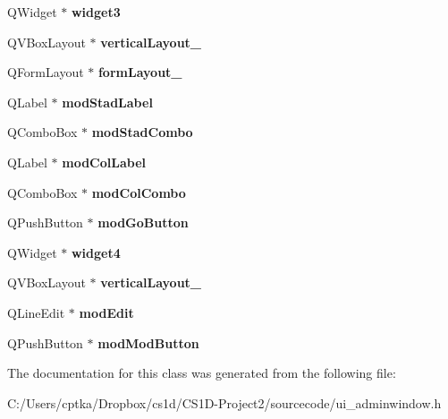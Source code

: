 \begin{DoxyCompactItemize}
Q\+Widget $\ast$ {\bfseries widget3}
\item 
\mbox{\label{class_ui___admin_window_acf63d0b9edd449bed7a6fd6505d3f020}} 
Q\+V\+Box\+Layout $\ast$ {\bfseries vertical\+Layout\+\_}
\item 
\mbox{\label{class_ui___admin_window_a77b319e8cf6e07d599ad4ad74b9022e6}} 
Q\+Form\+Layout $\ast$ {\bfseries form\+Layout\+\_}
\item 
\mbox{\label{class_ui___admin_window_a071c831909b0661251351f79ccc7b40f}} 
Q\+Label $\ast$ {\bfseries mod\+Stad\+Label}
\item 
\mbox{\label{class_ui___admin_window_acf510a2a329fab78425cdbd2bcc2806b}} 
Q\+Combo\+Box $\ast$ {\bfseries mod\+Stad\+Combo}
\item 
\mbox{\label{class_ui___admin_window_ad60ce495422a7c04f7889aae0237b0c2}} 
Q\+Label $\ast$ {\bfseries mod\+Col\+Label}
\item 
\mbox{\label{class_ui___admin_window_a621e2873cffcf192f2bb9da8357f1909}} 
Q\+Combo\+Box $\ast$ {\bfseries mod\+Col\+Combo}
\item 
\mbox{\label{class_ui___admin_window_aa4c7fe02cc96e626af62f831fea9ebca}} 
Q\+Push\+Button $\ast$ {\bfseries mod\+Go\+Button}
\item 
\mbox{\label{class_ui___admin_window_af741683e6e00449e3e7eb8b2d5033ba5}} 
Q\+Widget $\ast$ {\bfseries widget4}
\item 
\mbox{\label{class_ui___admin_window_ac230e26c2c4aa54e835a1ad02c942259}} 
Q\+V\+Box\+Layout $\ast$ {\bfseries vertical\+Layout\+\_}
\item 
\mbox{\label{class_ui___admin_window_a4ffc64d238cf2e26f0a330a443547e3d}} 
Q\+Line\+Edit $\ast$ {\bfseries mod\+Edit}
\item 
\mbox{\label{class_ui___admin_window_a81ee6cea348dc4421ecc11a6fa8f9329}} 
Q\+Push\+Button $\ast$ {\bfseries mod\+Mod\+Button}
\end{DoxyCompactItemize}


The documentation for this class was generated from the following file\+:\begin{DoxyCompactItemize}
\item 
C\+:/\+Users/cptka/\+Dropbox/cs1d/\+C\+S1\+D-\/\+Project2/sourcecode/ui\+\_\+adminwindow.\+h\end{DoxyCompactItemize}
